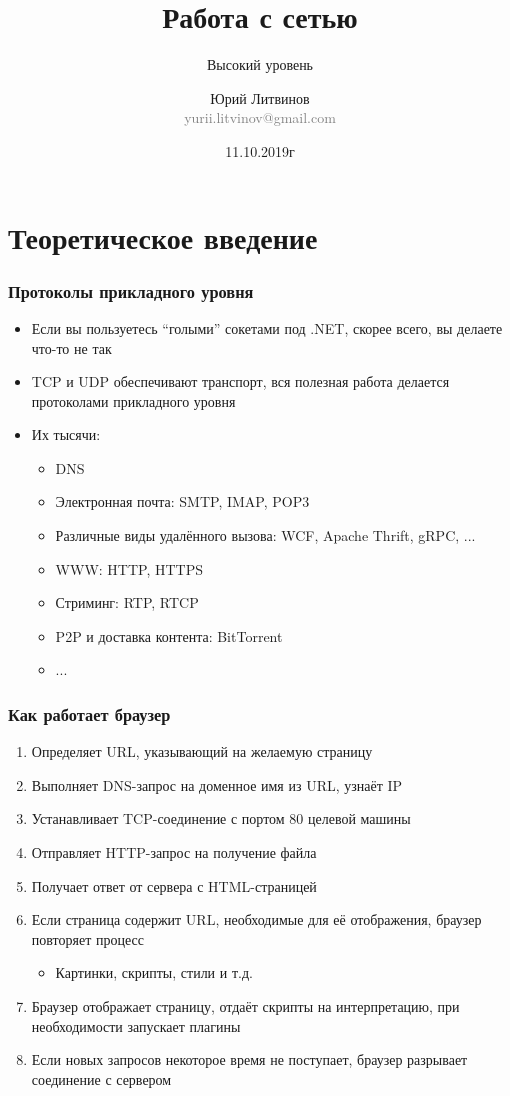 \documentclass[xetex,mathserif,serif]{beamer}
\title{Работа с сетью}
\subtitle{Высокий уровень}
\author[Юрий Литвинов]{Юрий Литвинов\\\small{\textcolor{gray}{yurii.litvinov@gmail.com}}}
\date{11.10.2019г}
\begin{document}
	\frame{\titlepage}

	\section{Теоретическое введение}

	\begin{frame}
		\frametitle{Протоколы прикладного уровня}
		\begin{itemize}
			\item Если вы пользуетесь ``голыми'' сокетами под .NET, скорее всего, вы делаете что-то не так
			\item TCP и UDP обеспечивают транспорт, вся полезная работа делается протоколами прикладного уровня
			\item Их тысячи:
			\begin{itemize}
				\item DNS
				\item Электронная почта: SMTP, IMAP, POP3
				\item Различные виды удалённого вызова: WCF, Apache Thrift, gRPC, ...
				\item WWW: HTTP, HTTPS
				\item Стриминг: RTP, RTCP
				\item P2P и доставка контента: BitTorrent
				\item ...
			\end{itemize}
		\end{itemize}
	\end{frame}

	\begin{frame}
		\frametitle{Как работает браузер}
		\begin{enumerate}
			\item Определяет URL, указывающий на желаемую страницу
			\item Выполняет DNS-запрос на доменное имя из URL, узнаёт IP
			\item Устанавливает TCP-соединение с портом 80 целевой машины
			\item Отправляет HTTP-запрос на получение файла
			\item Получает ответ от сервера с HTML-страницей
			\item Если страница содержит URL, необходимые для её отображения, браузер повторяет процесс
			\begin{itemize}
				\item Картинки, скрипты, стили и т.д.
			\end{itemize}
			\item Браузер отображает страницу, отдаёт скрипты на интерпретацию, при необходимости запускает плагины
			\item Если новых запросов некоторое время не поступает, браузер разрывает соединение с сервером
		\end{enumerate}
	\end{frame}
\end{document}
